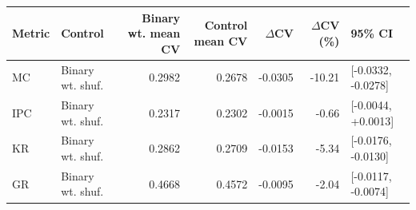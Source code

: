 \begin{tabular}{llrrrrl}
\toprule
Metric & Control & Binary wt. mean CV & Control mean CV & $\Delta$CV & $\Delta$CV (\%) & 95\% CI \\
\midrule
MC & Binary wt. shuf. & 0.2982 & 0.2678 & -0.0305 & -10.21 & [-0.0332, -0.0278] \\
IPC & Binary wt. shuf. & 0.2317 & 0.2302 & -0.0015 & -0.66 & [-0.0044, +0.0013] \\
KR & Binary wt. shuf. & 0.2862 & 0.2709 & -0.0153 & -5.34 & [-0.0176, -0.0130] \\
GR & Binary wt. shuf. & 0.4668 & 0.4572 & -0.0095 & -2.04 & [-0.0117, -0.0074] \\
\bottomrule
\end{tabular}
